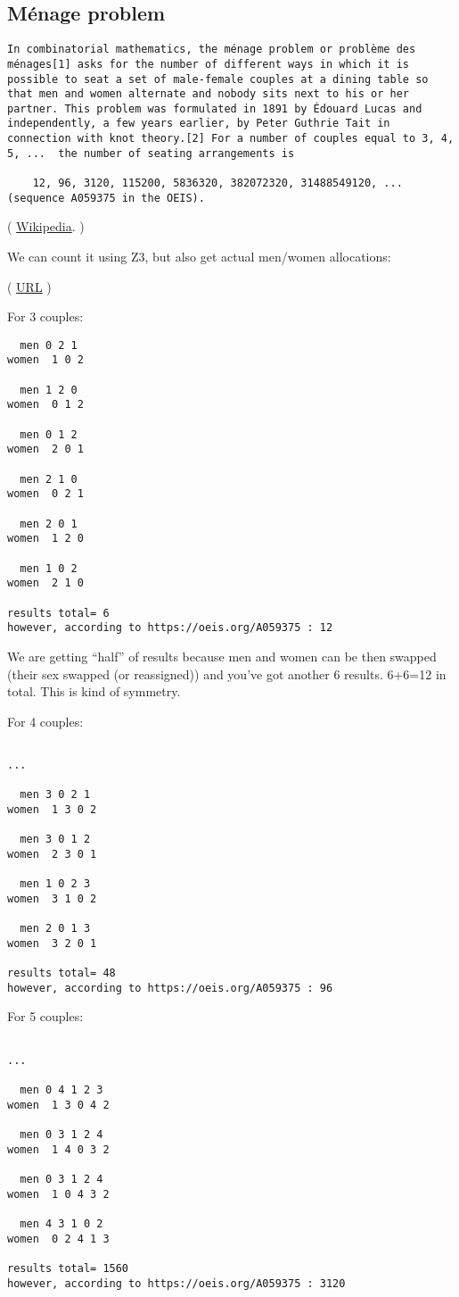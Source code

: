 \subsection{Ménage problem}

\begin{lstlisting}
In combinatorial mathematics, the ménage problem or problème des ménages[1] asks for the number of different ways in which it is possible to seat a set of male-female couples at a dining table so that men and women alternate and nobody sits next to his or her partner. This problem was formulated in 1891 by Édouard Lucas and independently, a few years earlier, by Peter Guthrie Tait in connection with knot theory.[2] For a number of couples equal to 3, 4, 5, ...  the number of seating arrangements is

    12, 96, 3120, 115200, 5836320, 382072320, 31488549120, ... (sequence A059375 in the OEIS). 
\end{lstlisting}

( \href{https://en.wikipedia.org/wiki/M%C3%A9nage_problem}{Wikipedia}. )

We can count it using Z3, but also get actual men/women allocations:



( \url{URL} )

For 3 couples:

\begin{lstlisting}
  men 0 2 1
women  1 0 2

  men 1 2 0
women  0 1 2

  men 0 1 2
women  2 0 1

  men 2 1 0
women  0 2 1

  men 2 0 1
women  1 2 0

  men 1 0 2
women  2 1 0

results total= 6
however, according to https://oeis.org/A059375 : 12
\end{lstlisting}

We are getting ``half'' of results because men and women can be then swapped (their sex swapped (or reassigned))
and you've got another 6 results.
6+6=12 in total.
This is kind of symmetry.

For 4 couples:

\begin{lstlisting}

...

  men 3 0 2 1
women  1 3 0 2

  men 3 0 1 2
women  2 3 0 1

  men 1 0 2 3
women  3 1 0 2

  men 2 0 1 3
women  3 2 0 1

results total= 48
however, according to https://oeis.org/A059375 : 96
\end{lstlisting}

For 5 couples:

\begin{lstlisting}

...

  men 0 4 1 2 3
women  1 3 0 4 2

  men 0 3 1 2 4
women  1 4 0 3 2

  men 0 3 1 2 4
women  1 0 4 3 2

  men 4 3 1 0 2
women  0 2 4 1 3

results total= 1560
however, according to https://oeis.org/A059375 : 3120
\end{lstlisting}

